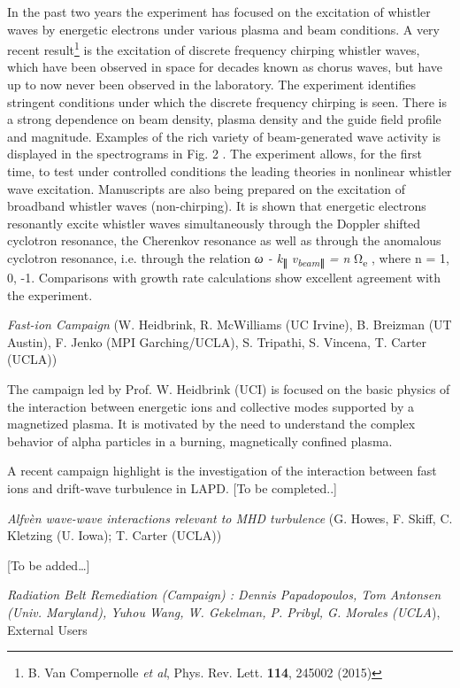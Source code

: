 \documentclass[11pt]{article}
\begin{document}
\begin{description}
In the past two years the experiment has focused on the excitation of
whistler waves by energetic electrons under various plasma and beam
conditions. A very recent result\footnote{B. Van Compernolle \emph{et
  al}, Phys. Rev. Lett. \textbf{114}, 245002 (2015)} is the excitation
of discrete frequency chirping whistler waves, which have been observed
in space for decades known as chorus waves, but have up to now never
been observed in the laboratory. The experiment identifies stringent
conditions under which the discrete frequency chirping is seen. There is
a strong dependence on beam density, plasma density and the guide field
profile and magnitude. Examples of the rich variety of beam-generated
wave activity is displayed in the spectrograms in Fig. 2 . The
experiment allows, for the first time, to test under controlled
conditions the leading theories in nonlinear whistler wave excitation.
Manuscripts are also being prepared on the excitation of broadband
whistler waves (non-chirping). It is shown that energetic electrons
resonantly excite whistler waves simultaneously through the Doppler
shifted cyclotron resonance, the Cherenkov resonance as well as through
the anomalous cyclotron resonance, i.e. through the relation \emph{ω -
k}\textsubscript{∥} \emph{v\textsubscript{beam}}\textsubscript{∥}
\emph{= n} Ω\textsubscript{e} , where n = 1, 0, -1. Comparisons with
growth rate calculations show excellent agreement with the experiment.

\emph{Fast-ion Campaign} (W. Heidbrink, R. McWilliams (UC Irvine), B.
Breizman (UT Austin), F. Jenko (MPI Garching/UCLA), S. Tripathi, S.
Vincena, T. Carter (UCLA))


The campaign led by Prof. W. Heidbrink (UCI) is focused on the basic
physics of the interaction between energetic ions and collective modes
supported by a magnetized plasma. It is motivated by the need to
understand the complex behavior of alpha particles in a burning,
magnetically confined plasma.

A recent campaign highlight is the investigation of the interaction
between fast ions and drift-wave turbulence in LAPD. {[}To be
completed..{]}


\emph{Alfvèn wave-wave interactions relevant to MHD turbulence} (G.
Howes, F. Skiff, C. Kletzing (U. Iowa); T. Carter (UCLA))

{[}To be added\ldots{}{]}

\emph{Radiation Belt Remediation (Campaign) : Dennis Papadopoulos, Tom
Antonsen (Univ. Maryland), Yuhou Wang, W. Gekelman, P. Pribyl, G.
Morales (UCLA}), External Users


\end{description}
\end{document}
